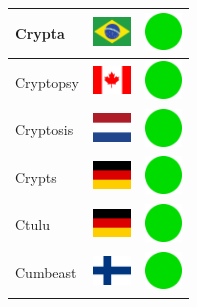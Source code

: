 \documentclass[12pt, a4paper, twoside]{report}
\begin{document}
\begin{center}
\begin{longtable}{|p{5cm}|p{2cm}|p{2cm}|}
 Crypta                                                     & \includegraphics[width=1cm]{4x3/br} &   \includegraphics[width=1cm]{likes/y} \\ \hline
 Cryptopsy                                                  & \includegraphics[width=1cm]{4x3/ca} &   \includegraphics[width=1cm]{likes/y} \\ \hline
 Cryptosis                                                  & \includegraphics[width=1cm]{4x3/nl} &   \includegraphics[width=1cm]{likes/y} \\ \hline
 Crypts                                                     & \includegraphics[width=1cm]{4x3/de} &   \includegraphics[width=1cm]{likes/y} \\ \hline
 Ctulu                                                      & \includegraphics[width=1cm]{4x3/de} &   \includegraphics[width=1cm]{likes/y} \\ \hline
 Cumbeast                                                   & \includegraphics[width=1cm]{4x3/fi} &   \includegraphics[width=1cm]{likes/y} \\ \hline

\end{longtable}
\end{center}
\end{document}
